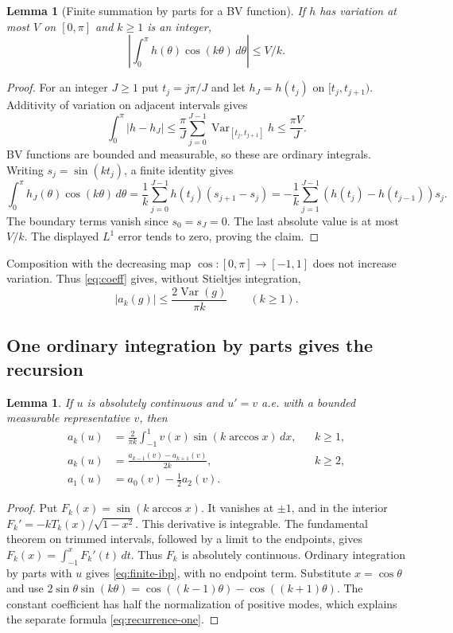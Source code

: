 \documentclass[11pt]{article}
\newcommand{\Var}{\operatorname{Var}}
\newtheorem{lemma}[theorem]{Lemma}
\theoremstyle{remark}\newtheorem{remark}[theorem]{Remark}
\begin{document}
\begin{lemma}[Finite summation by parts for a BV function]\label{lem:bvbase}
If $h$ has variation at most $V$ on $[0,\pi]$ and $k\ge1$ is an integer,
\[
 \left|\int_0^\pi h(\theta)\cos(k\theta)\,d\theta\right|\le V/k.
\]
\end{lemma}
\begin{proof}
For an integer $J\ge1$ put $t_j=j\pi/J$ and let $h_J=h(t_j)$ on
$[t_j,t_{j+1})$. Additivity of variation on adjacent intervals gives
\[
 \int_0^\pi|h-h_J|\le\frac\pi J
       \sum_{j=0}^{J-1}\Var_{[t_j,t_{j+1}]}h\le\frac{\pi V}{J}.
\]
BV functions are bounded and measurable, so these are ordinary integrals.
Writing $s_j=\sin(kt_j)$, a finite identity gives
\begin{equation}\label{eq:sbp}
 \int_0^\pi h_J(\theta)\cos(k\theta)\,d\theta
 =\frac1k\sum_{j=0}^{J-1}h(t_j)(s_{j+1}-s_j)
 =-\frac1k\sum_{j=1}^{J-1}(h(t_j)-h(t_{j-1}))s_j.
\end{equation}
The boundary terms vanish since $s_0=s_J=0$. The last absolute value is
at most $V/k$. The displayed $L^1$ error tends to zero, proving the claim.
\end{proof}
Composition with the decreasing map $\cos:[0,\pi]\to[-1,1]$ does not
increase variation. Thus \eqref{eq:coeff} gives, without Stieltjes integration,
\begin{equation}\label{eq:bvzero}
 |a_k(g)|\le\frac{2\Var(g)}{\pi k}\qquad(k\ge1).
\end{equation}

\subsection{One ordinary integration by parts gives the recursion}
\begin{lemma}\label{lem:recurrence}
If $u$ is absolutely continuous and $u'=v$ a.e. with a bounded measurable
representative $v$, then
\begin{align}
 a_k(u)&=\frac2{\pi k}\int_{-1}^1v(x)\sin(k\arccos x)\,dx,
                  &&k\ge1,\label{eq:finite-ibp}\\
 a_k(u)&=\frac{a_{k-1}(v)-a_{k+1}(v)}{2k},&&k\ge2,\label{eq:recurrence}\\
 a_1(u)&=a_0(v)-\tfrac12a_2(v).&&\label{eq:recurrence-one}
\end{align}
\end{lemma}
\begin{proof}
Put $F_k(x)=\sin(k\arccos x)$. It vanishes at $\pm1$, and in the
interior $F_k'=-kT_k(x)/\sqrt{1-x^2}$. This derivative is integrable.
The fundamental theorem on trimmed intervals, followed by a limit to the
endpoints, gives $F_k(x)=\int_{-1}^x F_k'(t)\,dt$. Thus $F_k$ is
absolutely continuous. Ordinary integration by parts with $u$ gives
\eqref{eq:finite-ibp}, with no endpoint term. Substitute $x=\cos\theta$
and use $2\sin\theta\sin(k\theta)=\cos((k-1)\theta)-\cos((k+1)\theta)$.
The constant coefficient has half the normalization of positive modes,
which explains the separate formula \eqref{eq:recurrence-one}.
\end{proof}
\end{document}
